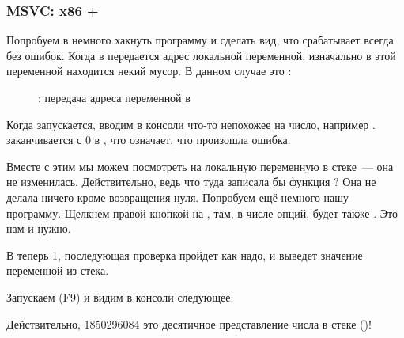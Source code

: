 \clearpage
\subsubsection{MSVC: x86 + \olly}

Попробуем в \olly немного хакнуть программу и сделать вид, что \scanf срабатывает всегда без ошибок.
Когда в \scanf передается адрес локальной переменной, изначально в этой переменной
находится некий мусор. В данном случае это :

\begin{figure}[H]
\centering
{}
\caption{\olly: передача адреса переменной в \scanf}
\label{fig:scanf_ex3_olly_1}
\end{figure}

\clearpage
Когда \scanf запускается, вводим в консоли что-то непохожее на число, например .
\scanf заканчивается с 0 в \EAX, что означает, что произошла ошибка.

Вместе с этим мы можем посмотреть на локальную переменную в стеке~--- она не изменилась.
Действительно, ведь что туда записала бы функция \scanf?
Она не делала ничего кроме возвращения нуля.
Попробуем ещё немного  нашу программу.
Щелкнем правой кнопкой на \EAX, там, в числе опций, будет также .
Это нам и нужно.

В \EAX теперь 1, последующая проверка пройдет как надо, и \printf выведет значение переменной из стека.

Запускаем (F9) и видим в консоли следующее:



Действительно, 1850296084 это десятичное представление числа в стеке ()!
